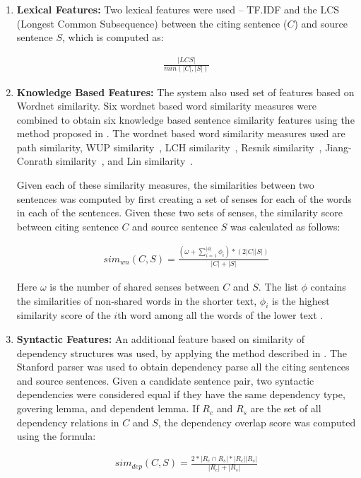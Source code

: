 \documentclass[11pt]{article}
\begin{document}
\begin{enumerate}
\item{\bf Lexical Features:} Two lexical features were used -- TF.IDF and the 
LCS (Longest Common Subsequence) between the citing sentence ($C$) and source 
sentence $S$, which is computed as:

\vspace{-.3cm}
\begin{eqnarray*}
  \frac{|LCS|}{min(|C|,|S|)}
\end{eqnarray*}

\item{\bf Knowledge Based Features:} The system also used set of features 
based on Wordnet similarity. Six wordnet based word similarity measures were 
combined to obtain six knowledge based sentence similarity features using the 
method proposed in \cite{Banea2012}. The wordnet based word similarity 
measures used are path similarity, WUP 
similarity~\cite{Wu:1994:VSL:981732.981751}, 
LCH similarity~\cite{leacock1998combining}, 
Resnik similarity~\cite{Resnik:1995:UIC:1625855.1625914}, Jiang-Conrath 
similarity~\cite{Jiang97taxonomySimilarity}, and Lin 
similarity~\cite{Lin:1998:IDS:645527.657297}. 

Given each of these similarity measures, the similarities between two 
sentences was computed by first creating a set of senses for each of the words 
in each of the sentences. Given these two sets of senses, the similarity 
score between citing sentence $C$ and source sentence $S$ was calculated 
as follows:

\vspace{-.3cm}
\begin{eqnarray*}
  sim_{wn}(C,S) = \frac{(\omega + \sum_{i=1}^{|\phi|}\phi_i) * (2|C||S|)}{|C|+|S|}
\end{eqnarray*}

Here $\omega$ is the number of shared senses between $C$ and $S$. The list 
$\phi$ contains the similarities of non-shared words in the shorter text, 
$\phi_i$ is the highest similarity score of the $i$th word among all the 
words of the lower text \cite{S13-1017}. 

\item{\bf Syntactic Features:} An additional feature based on similarity of 
dependency structures was used, by applying the method described in 
\cite{S13-1017}. The Stanford parser was used to obtain dependency parse all 
the citing sentences and source sentences. Given a candidate sentence pair, 
two syntactic dependencies were considered equal if they have the same 
dependency type, govering lemma, and dependent lemma. If $R_c$ and $R_s$ are 
the set of all dependency relations in $C$ and $S$, the dependency overlap 
score was computed using the formula:

\vspace{-.3cm}
\begin{eqnarray*}
  sim_{dep}(C,S) = \frac{2*|R_c \cap R_s| * |R_c||R_s|}{|R_c|+|R_s|}
\end{eqnarray*}

\end{enumerate}
\end{document}
